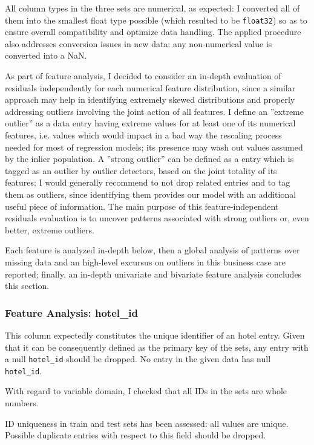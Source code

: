 \documentclass[preprint,12pt,3p]{elsarticle}
\begin{document}
All column types in the three sets are numerical, as expected: I converted all of them into the smallest float type possible (which resulted to be \verb|float32|) so as to ensure overall compatibility and optimize data handling. The applied procedure also addresses conversion issues in new data: any non-numerical value is converted into a NaN.

As part of feature analysis, I decided to consider an in-depth evaluation of residuals independently for each numerical feature distribution, since a similar approach may help in identifying extremely skewed distributions and properly addressing outliers involving the joint action of all features. I define an ''extreme outlier'' as a data entry having extreme values for at least one of its numerical features, i.e. values which would impact in a bad way the rescaling process needed for most of regression models; its presence may wash out values assumed by the inlier population. A ''strong outlier'' can be defined as a entry which is tagged as an outlier by outlier detectors, based on the joint totality of its features; I would generally recommend to not drop related entries and to tag them as outliers, since identifying them provides our model with an additional useful piece of information. The main purpose of this feature-independent residuals evaluation is to uncover patterns associated with strong outliers or, even better, extreme outliers.

Each feature is analyzed in-depth below, then a global analysis of patterns over missing data and an high-level excursus on outliers in this business case are reported; finally, an in-depth univariate and bivariate feature analysis concludes this section.

\subsubsection{Feature Analysis: hotel\_id}
This column expectedly constitutes the unique identifier of an hotel entry. Given that it can be consequently defined as the primary key of the sets, any entry with a null \verb|hotel_id| should be dropped. No entry in the given data has null \verb|hotel_id|.

With regard to variable domain, I checked that all IDs in the sets are whole numbers.

ID uniqueness in train and test sets has been assessed: all values are unique. Possible duplicate entries with respect to this field should be dropped.
\end{document}
